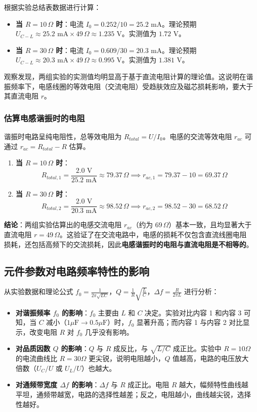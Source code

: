 \documentclass{article}
\begin{document}
根据实验总结表数据进行计算：
\begin{itemize}
    \item \textbf{当 $R=10\,\Omega$ 时}：电流 $I_0 = 0.252 / 10 = 25.2\text{ mA}$。理论预期 $U_{C-L} \approx 25.2\text{ mA} \times 49\,\Omega \approx 1.235\text{ V}$。实测值为 $1.72\text{ V}$。
    \item \textbf{当 $R=30\,\Omega$ 时}：电流 $I_0 = 0.609 / 30 = 20.3\text{ mA}$。理论预期 $U_{C-L} \approx 20.3\text{ mA} \times 49\,\Omega \approx 0.995\text{ V}$。实测值为 $1.381\text{ V}$。
\end{itemize}
观察发现，两组实验的实测值均明显高于基于直流电阻计算的理论值。这说明在谐振频率下，电感线圈的等效电阻（交流电阻）受趋肤效应及磁芯损耗影响，要大于其直流电阻 $r$。

\subsubsection{估算电感谐振时的电阻}
谐振时电路呈纯电阻性，总等效电阻为 $R_{total} = U / I_0$。电感的交流等效电阻 $r_{ac}$ 可通过 $r_{ac} = R_{total} - R$ 估算。

\begin{enumerate}
    \item \textbf{当 $R=10\,\Omega$ 时}：
    $$R_{total, 1} = \frac{2.0\text{ V}}{25.2\text{ mA}} \approx 79.37\,\Omega \implies r_{ac, 1} = 79.37 - 10 = 69.37\,\Omega$$
    \item \textbf{当 $R=30\,\Omega$ 时}：
    $$R_{total, 2} = \frac{2.0\text{ V}}{20.3\text{ mA}} \approx 98.52\,\Omega \implies r_{ac, 2} = 98.52 - 30 = 68.52\,\Omega$$
\end{enumerate}

\textbf{结论}：两组实验估算出的电感交流电阻 $r_{ac}$（约为 $69\,\Omega$）基本一致，且均显著大于直流电阻 $r=49\,\Omega$。这验证了在交流电路中，电感的损耗不仅包含直流线圈电阻损耗，还包括高频下的交流损耗，因此\textbf{电感谐振时的电阻与直流电阻是不相等的}。

\subsection{元件参数对电路频率特性的影响}
从实验数据和理论公式 $f_0 = \frac{1}{2\pi\sqrt{LC}}$，$Q = \frac{1}{R}\sqrt{\frac{L}{C}}$，$\Delta f = \frac{R}{2\pi L}$ 进行分析：
\begin{itemize}
    \item \textbf{对谐振频率 $f_0$ 的影响}：$f_0$ 主要由 $L$ 和 $C$ 决定。实验对比内容 1 和内容 3 可知，当 $C$ 减小（$1\mu\text{F} \to 0.5\mu\text{F}$）时，$f_0$ 显著升高；而内容 1 与内容 2 对比显示，改变电阻 $R$ 对 $f_0$ 几乎没有影响。
    \item \textbf{对品质因数 $Q$ 的影响}：$Q$ 与 $R$ 成反比，与 $\sqrt{L/C}$ 成正比。实验中 $R=10\Omega$ 的电流曲线比 $R=30\Omega$ 更尖锐，说明电阻越小，$Q$ 值越高，电路的电压放大倍数（$U_C/U$ 或 $U_L/U$）也越大。
    \item \textbf{对通频带宽度 $\Delta f$ 的影响}：$\Delta f$ 与 $R$ 成正比。电阻 $R$ 越大，幅频特性曲线越平坦，通频带越宽，电路的选择性越差；反之，电阻越小，曲线越尖锐，选择性越好。
\end{itemize}
\end{document}
